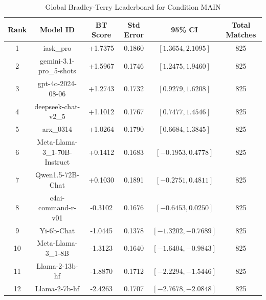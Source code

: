 \begin{table}[ht]
\centering
\caption{Global Bradley-Terry Leaderboard for Condition \textsc{MAIN}}
\label{tab:leaderboard_main}
\begin{tabular}{cccccc}
\hline
\textbf{Rank} & \textbf{Model ID} & \textbf{BT Score} & \textbf{Std Error} & \textbf{95\% CI} & \textbf{Total Matches} \\
\hline
1 & iask\_pro & +1.7375 & 0.1860 & $[1.3654, 2.1095]$ & 825 \\
2 & gemini-3.1-pro\_5-shots & +1.5967 & 0.1746 & $[1.2475, 1.9460]$ & 825 \\
3 & gpt-4o-2024-08-06 & +1.2743 & 0.1732 & $[0.9279, 1.6208]$ & 825 \\
4 & deepseek-chat-v2\_5 & +1.1012 & 0.1767 & $[0.7477, 1.4546]$ & 825 \\
5 & arx\_0314 & +1.0264 & 0.1790 & $[0.6684, 1.3845]$ & 825 \\
6 & Meta-Llama-3\_1-70B-Instruct & +0.1412 & 0.1683 & $[-0.1953, 0.4778]$ & 825 \\
7 & Qwen1.5-72B-Chat & +0.1030 & 0.1891 & $[-0.2751, 0.4811]$ & 825 \\
8 & c4ai-command-r-v01 & -0.3102 & 0.1676 & $[-0.6453, 0.0250]$ & 825 \\
9 & Yi-6b-Chat & -1.0445 & 0.1378 & $[-1.3202, -0.7689]$ & 825 \\
10 & Meta-Llama-3\_1-8B & -1.3123 & 0.1640 & $[-1.6404, -0.9843]$ & 825 \\
11 & Llama-2-13b-hf & -1.8870 & 0.1712 & $[-2.2294, -1.5446]$ & 825 \\
12 & Llama-2-7b-hf & -2.4263 & 0.1707 & $[-2.7678, -2.0848]$ & 825 \\
\hline
\end{tabular}
\end{table}
